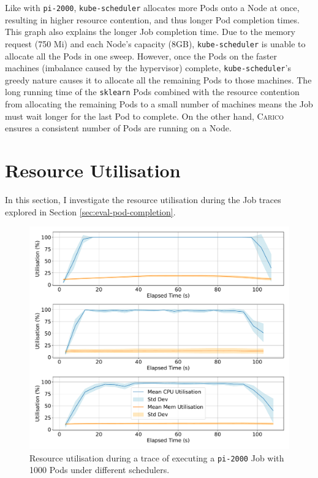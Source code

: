Like with \texttt{pi-2000}, \texttt{kube-scheduler} allocates more Pods onto a
Node at once, resulting in higher resource contention, and thus longer Pod
completion times. This graph also explains the longer Job completion time. Due
to the memory request (750 Mi) and each Node's capacity (8GB),
\texttt{kube-scheduler} is unable to allocate all the Pods in one sweep.
However, once the Pods on the faster machines (imbalance caused by the
hypervisor) complete, \texttt{kube-scheduler}'s greedy nature causes it to
allocate all the remaining Pods to those machines. The long running time of the
\texttt{sklearn} Pods combined with the resource contention from allocating the
remaining Pods to a small number of machines means the Job must wait longer for
the last Pod to complete. On the other hand, \textsc{Carico} ensures a
consistent number of Pods are running on a Node.

\section{Resource Utilisation}
\label{sec:eval-util}
In this section, I investigate the resource utilisation during the Job traces
explored in Section \ref{sec:eval-pod-completion}.

\begin{figure}[h]
    \centering
    \includegraphics[width=\textwidth]{images/pi-util.pdf}
    \caption{Resource utilisation during a trace of executing a \texttt{pi-2000}
    Job with 1000 Pods under different schedulers.}
    \label{fig:pi-2000-1000x-pod-util}
\end{figure}

